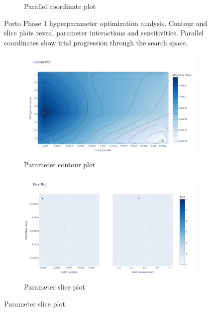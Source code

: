 \begin{figure}[H]
\begin{subfigure}{0.49\linewidth}
        \caption{Parallel coordinate plot}
    \end{subfigure}
    \caption{Porto Phase 1 hyperparameter optimization analysis. Contour and slice plots reveal parameter interactions and sensitivities. Parallel coordinates show trial progression through the search space.}
    \label{fig:appendix-optuna-phase1}
\end{figure}

\begin{figure}[H]
    \centering
    \begin{subfigure}{0.49\linewidth}
        \centering
        \includegraphics[width=\linewidth]{assets/plots/eval/porto/optuna/phase2/contour_plot.pdf}
        \caption{Parameter contour plot}
    \end{subfigure}
    \begin{subfigure}{0.49\linewidth}
        \centering
        \includegraphics[width=\linewidth]{assets/plots/eval/porto/optuna/phase2/slice_plot.pdf}
        \caption{Parameter slice plot}
    \end{subfigure}

\end{figure}
